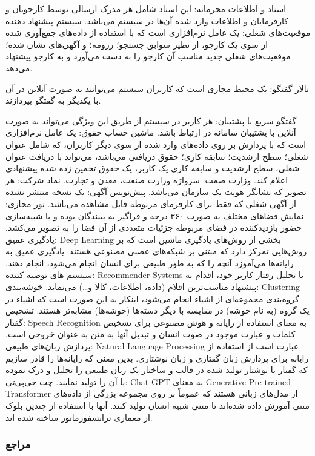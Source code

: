 \documentclass[12pt]{article}
\begin{document}
		اسناد و اطلاعات محرمانه: این اسناد شامل هر مدرک ارسالی توسط کارجویان و کارفرمایان و اطلاعات وارد شده آن‌ها در سیستم می‌باشد.
		سیستم پیشنهاد دهنده موقعیت‌های شغلی: یک عامل نرم‌افزاری است که با استفاده از داده‌های جمع‌آوری شده از سوی یک کارجو، از نظیر سوابق جستجو؛ رزومه؛ و آگهی‌های نشان شده؛ موقعیت‌های شغلی جدید مناسب آن کارجو را به دست می‌آورد و به کارجو پیشنهاد می‌دهد.

		تالار گفتگو: یک محیط مجازی است که کاربران سیستم می‌توانند به صورت آنلاین در آن با یکدیگر به گفتگو بپردازند.

		گفتگو سریع با پشتیبان: هر کاربر در سیستم از طریق این ویژگی می‌تواند به صورت آنلاین با پشتیبان سامانه در ارتباط باشد.
		ماشین حساب حقوق: یک عامل نرم‌افزاری است که با پردازش بر روی داده‌های وارد شده از سوی دیگر کاربران، که شامل عنوان شغلی؛ سطح ارشدیت؛ سابقه کاری؛ حقوق دریافتی می‌باشد، می‌تواند با دریافت عنوان شغلی، سطح ارشدیت و سابقه کاری یک کاربر، یک حقوق تخمین زده شده پیشنهادی اعلام کند.
		وزارت صمت: سرواژه وزارت صنعت، معدن و تجارت.
		نماد شرکت: هر تصویر که نشانگر هویت یک سازمان می‌باشد.
		پیش‌نویس آگهی: یک نسخه منتشر نشده از آگهی شغلی که فقط برای کارفرمای مربوطه قابل مشاهده می‌باشد.
		تور مجازی:‌ نمایش فضاهای مختلف به صورت ۳۶۰ درجه و فراگیر به بینندگان بوده و با شبیه‌سازی حضور بازدیدکننده در فضای مربوطه جزئیات متعددی از آن فضا را به تصویر می‌کشد.
		یادگیری عمیق: Deep Learning  بخشی از روش‌های یادگیری ماشین است که بر روش‌هایی تمرکز دارد که مبتنی بر شبکه‌های عصبی مصنوعی هستند. یادگیری عمیق به رایانه‌ها می‌آموزد آنچه را که به طور طبیعی برای انسان انجام می‌شود، انجام دهند.
		سیستم های توصیه کننده: Recommender Systems با تحلیل رفتار کاربر خود، اقدام به پیشنهاد مناسب‌ترین اقلام (داده، اطلاعات، کالا و…) می‌نماید.
		خوشه‌بندی: Clustering گروه‌بندی مجموعه‌ای از اشیاء انجام می‌شود، اینکار به این صورت است که اشیاء در یک گروه (به نام خوشه) در مقایسه با دیگر دسته‌ها (خوشه‌ها) مشابه‌تر هستند.
		تشخیص گفتار: Speech Recognition به معنای استفاده از رایانه و هوش مصنوعی برای تشخیص کلمات و عبارت موجود در صوت انسان و تبدیل آنها به متن به عنوان خروجی است.
		پردازش زبان‌های طبیعی: Natural Language Processing عبارت است از استفاده از رایانه برای پردازش زبان گفتاری و زبان نوشتاری. بدین معنی که رایانه‌ها را قادر سازیم که گفتار یا نوشتار تولید شده در قالب و ساختار یک زبان طبیعی را تحلیل و درک نموده یا آن را تولید نمایند.
		چت جی‌پی‌تی: Chat GPT به معنای Generative Pre-trained Transformer از مدل‌های زبانی هستند که عموماً بر روی مجموعه بزرگی از داده‌های متنی آموزش داده شده‌اند تا متنی شبیه انسان تولید کنند. آنها با استفاده از چندین بلوک از معماری ترانسفورماتور ساخته شده اند.

	\subsubsection{مراجع}
\end{document}

